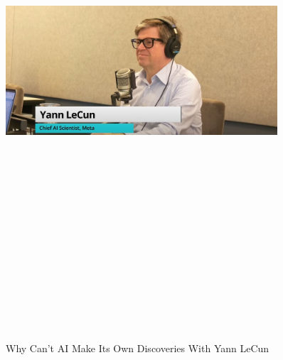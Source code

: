 \documentclass[a4paper,12pt]{article}
\begin{document}
\newpage
\vspace*{1cm} %
\begin{figure}[h]
	\centering
	\vspace{-10pt} %
	\includegraphics[width=0.9\textwidth, height=20cm, keepaspectratio]{../Talks Blogs/Why Can't AI Make Its Own Discoveries With Yann LeCun}
	\vspace{-5pt} %
	\caption{Why Can't AI Make Its Own Discoveries With Yann LeCun}
	\vspace{-10pt}
\end{figure}
\end{document}
